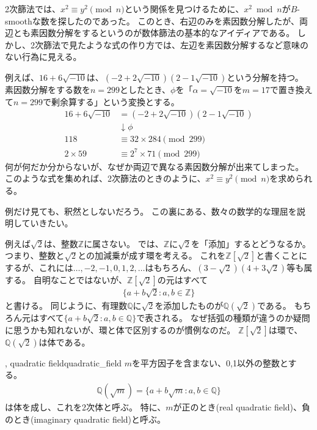 2次篩法では、$x^2\equiv y^2 \pmod{n}$という関係を見つけるために、$x^2\bmod{n}$が$B$-smoothな数を探したのであった。
このとき、右辺のみを素因数分解したが、両辺とも素因数分解をするというのが数体篩法の基本的なアイディアである。
しかし、2次篩法で見たような式の作り方では、左辺を素因数分解するなど意味のない行為に見える。

例えば、$16 + 6\sqrt{-10}$は、$(-2+2\sqrt{-10})(2-1\sqrt{-10})$という分解を持つ。
素因数分解をする数を$n=299$としたとき、$\phi$を「$\alpha=\sqrt{-10}$を$m=17$で置き換えて$n=299$で剰余算する」という変換とする。
\begin{align*}
16 + 6\sqrt{-10} &= (-2+2\sqrt{-10})(2-1\sqrt{-10})\\
&\downarrow \phi \\
118 &\equiv 32 \times 284\pmod{299}\\
2 \times 59 &\equiv 2^7 \times 71 \pmod{299}
\end{align*}
何が何だか分からないが、なぜか両辺で異なる素因数分解が出来てしまった。
このような式を集めれば、2次篩法のときのように、$x^2\equiv y^2 \pmod{n}$を求められる。

例だけ見ても、釈然としないだろう。
この裏にある、数々の数学的な理屈を説明していきたい。

例えば$\sqrt{2}$は、整数$\mathbb{Z}$に属さない。
では、$\mathbb{Z}$に$\sqrt{2}$を「添加」するとどうなるか。
つまり、整数と$\sqrt{2}$との加減乗が成す環を考える。
これを$\mathbb{Z}[\sqrt{2}]$と書くことにするが、これには$\ldots,-2,-1,0,1,2,\ldots$はもちろん、$(3-\sqrt{2})(4+3\sqrt{2})$等も属する。
自明なことではないが、$\mathbb{Z}[\sqrt{2}]$の元はすべて
\begin{align*}
\{ a + b\sqrt{2} : a, b \in \mathbb{Z}\}
\end{align*}
と書ける。
同じように、有理数$\mathbb{Q}$に$\sqrt{2}$を添加したものが$\mathbb{Q}(\sqrt{2})$である。
もちろん元はすべて$\{ a + b\sqrt{2} : a, b \in \mathbb{Q}\}$で表される。
なぜ括弧の種類が違うのか疑問に思うかも知れないが、環と体で区別するのが慣例なのだ。
$\mathbb{Z}[\sqrt{2}]$は環で、$\mathbb{Q}(\sqrt{2})$は体である。

\begin{Defi}{, quadratic field}{quadratic_field}
$m$を平方因子を含まない、0,1以外の整数とする。
\begin{align*}
\mathbb{Q}(\sqrt{m}) = \{a + b\sqrt{m} : a,b \in\mathbb{Q}\}
\end{align*}
は体を成し、これを2次体と呼ぶ。
特に、$m$が正のとき(real quadratic field)、負のとき(imaginary quadratic field)と呼ぶ。
\end{Defi}

